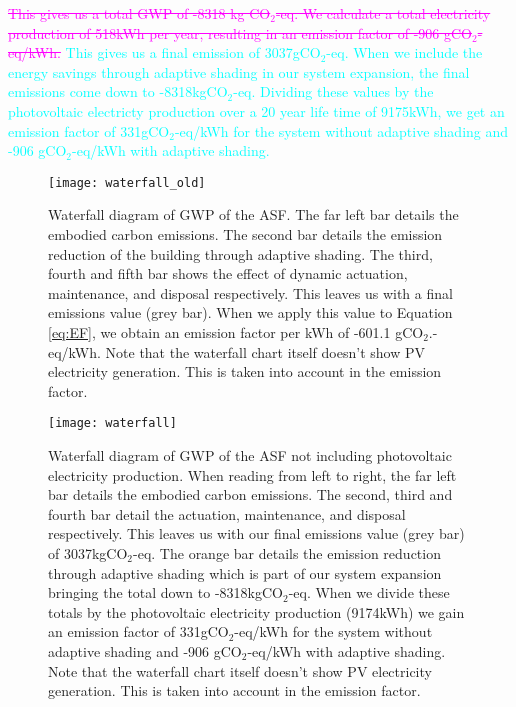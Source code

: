 \textcolor{magenta}{\sout{This gives us a total GWP of -8318 kg CO$_{2}$-eq. We calculate a total electricity production of 518kWh per year, resulting in an emission factor of -906 gCO$_{2}$-eq/kWh.}}
\textcolor{cyan}{This gives us a final emission of 3037gCO$_2$-eq. When we include the energy savings through adaptive shading in our system expansion, the final emissions come down to -8318kgCO$_2$-eq. Dividing these values by the photovoltaic electricty production over a 20 year life time of 9175kWh, we get an emission factor of 331gCO$_2$-eq/kWh for the system without adaptive shading and -906 gCO$_2$-eq/kWh with adaptive shading.}

\begin{figure}[H]
\begin{center}
\begin{mdframed}[linecolor=magenta, linewidth=2pt]
\texttt{[image: waterfall\_old]}
\caption{Waterfall diagram of GWP of the ASF. The far left bar details the embodied carbon emissions. The second bar details the emission reduction of the building through adaptive shading. The third, fourth and fifth bar shows the effect of dynamic actuation, maintenance, and disposal respectively. This leaves us with a final emissions value (grey bar). When we apply this value to Equation \ref{eq:EF}, we obtain an emission factor per kWh of -601.1 gCO$_2$.-eq/kWh. Note that the waterfall chart itself doesn't show PV electricity generation. This is taken into account in the emission factor.}

\label{fig:waterfallold}
\end{mdframed}
\end{center}
\end{figure}


\begin{figure}[H]
\begin{center}
\begin{mdframed}[linecolor=cyan, linewidth=2pt]
\texttt{[image: waterfall]}
\caption{Waterfall diagram of GWP of the ASF not including photovoltaic electricity production. When reading from left to right, the far left bar details the embodied carbon emissions. The second, third and fourth bar detail the actuation, maintenance, and disposal respectively. This leaves us with our final emissions value (grey bar) of 3037kgCO$_2$-eq. The orange bar details the emission reduction through adaptive shading which is part of our system expansion bringing the total down to -8318kgCO$_2$-eq. When we divide these totals by the photovoltaic electricity production (9174kWh) we gain an emission factor of 331gCO$_2$-eq/kWh for the system without adaptive shading and -906 gCO$_2$-eq/kWh with adaptive shading. Note that the waterfall chart itself doesn't show PV electricity generation. This is taken into account in the emission factor.}

\label{fig:waterfall}
\end{mdframed}
\end{center}
\end{figure}

